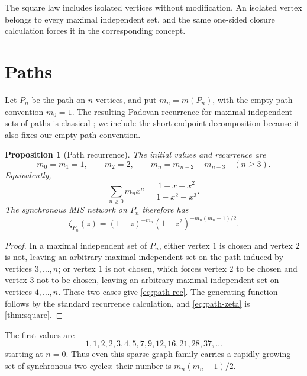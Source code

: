 \documentclass[11pt,a4paper]{amsart}
\newtheorem{proposition}[theorem]{Proposition}
\theoremstyle{definition}
\theoremstyle{remark}
\begin{document}
The square law includes isolated vertices without modification.  An
isolated vertex belongs to every maximal independent set, and the same
one-sided closure calculation forces it in the corresponding concept.

\section{Paths}

Let $P_n$ be the path on $n$ vertices, and put $m_n=m(P_n)$, with the
empty path convention $m_0=1$.  The resulting Padovan recurrence for
maximal independent sets of paths is classical \cite[Remark~2.2]{EulerOleksikSkupien2013};
we include the short endpoint decomposition because it also fixes our
empty-path convention.

\begin{proposition}[Path recurrence]\label{prop:path}
The initial values and recurrence are
\begin{equation}\label{eq:path-rec}
 m_0=m_1=1,\qquad m_2=2,\qquad
 m_n=m_{n-2}+m_{n-3}\quad(n\ge3).
\end{equation}
Equivalently,
\begin{equation}\label{eq:path-gf}
 \sum_{n\ge0}m_nx^n=\frac{1+x+x^2}{1-x^2-x^3}.
\end{equation}
The synchronous MIS network on $P_n$ therefore has
\begin{equation}\label{eq:path-zeta}
 \zeta_{P_n}(z)=(1-z)^{-m_n}
 (1-z^2)^{-m_n(m_n-1)/2}.
\end{equation}
\end{proposition}

\begin{proof}
In a maximal independent set of $P_n$, either vertex $1$ is chosen and
vertex $2$ is not, leaving an arbitrary maximal independent set on the
path induced by vertices $3,\ldots,n$; or vertex $1$ is not chosen, which
forces vertex $2$ to be chosen and vertex $3$ not to be chosen, leaving an
arbitrary maximal independent set on vertices $4,\ldots,n$.  These two
cases give \eqref{eq:path-rec}.  The generating function follows by the
standard recurrence calculation, and \eqref{eq:path-zeta} is
\cref{thm:square}.
\end{proof}

The first values are
\[
 1,1,2,2,3,4,5,7,9,12,16,21,28,37,\ldots
\]
starting at $n=0$.  Thus even this sparse graph family carries a rapidly
growing set of synchronous two-cycles: their number is
$m_n(m_n-1)/2$.
\end{document}

